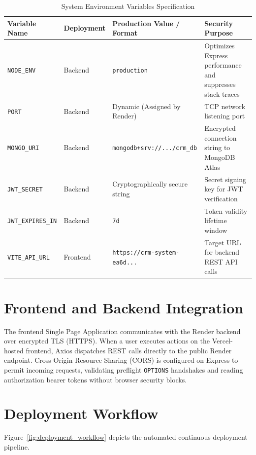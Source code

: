 \begin{table}[h!]
\centering
\caption{System Environment Variables Specification}
\label{tab:env_vars}
\renewcommand{\arraystretch}{1.25}
\begin{tabular}{|p{3.2cm}|p{2cm}|p{4.5cm}|p{4.3cm}|}
\hline
\textbf{Variable Name} & \textbf{Deployment} & \textbf{Production Value / Format} & \textbf{Security Purpose} \\ \hline
\texttt{NODE\_ENV} & Backend & \texttt{production} & Optimizes Express performance and suppresses stack traces \\ \hline
\texttt{PORT} & Backend & Dynamic (Assigned by Render) & TCP network listening port \\ \hline
\texttt{MONGO\_URI} & Backend & \texttt{mongodb+srv://.../crm\_db} & Encrypted connection string to MongoDB Atlas \\ \hline
\texttt{JWT\_SECRET} & Backend & Cryptographically secure string & Secret signing key for JWT verification \\ \hline
\texttt{JWT\_EXPIRES\_IN} & Backend & \texttt{7d} & Token validity lifetime window \\ \hline
\texttt{VITE\_API\_URL} & Frontend & \texttt{https://crm-system-ea6d...} & Target URL for backend REST API calls \\ \hline
\end{tabular}
\end{table}

\section{Frontend and Backend Integration}
The frontend Single Page Application communicates with the Render backend over encrypted TLS (HTTPS). When a user executes actions on the Vercel-hosted frontend, Axios dispatches REST calls directly to the public Render endpoint. Cross-Origin Resource Sharing (CORS) is configured on Express to permit incoming requests, validating preflight \texttt{OPTIONS} handshakes and reading authorization bearer tokens without browser security blocks.

\section{Deployment Workflow}
Figure~\ref{fig:deployment_workflow} depicts the automated continuous deployment pipeline.

